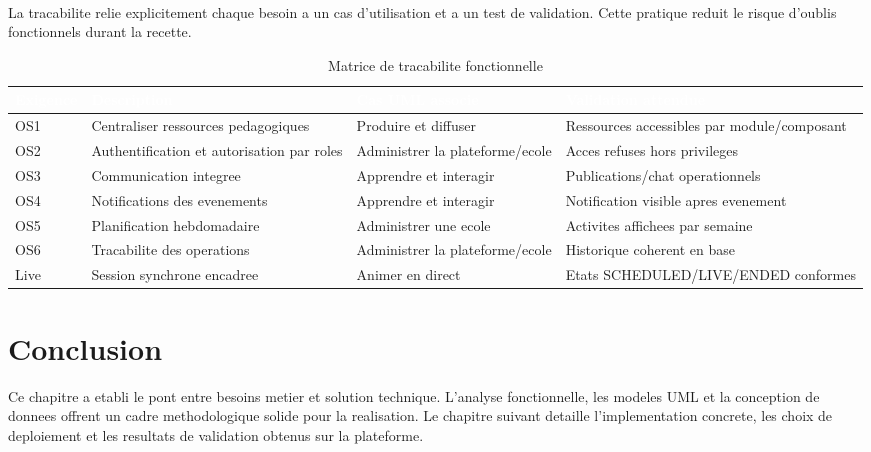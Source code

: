 ﻿﻿\documentclass[12pt,a4paper,oneside]{report}
\begin{document}
La tracabilite relie explicitement chaque besoin a un cas d'utilisation et a un test de validation. Cette pratique reduit le risque d'oublis fonctionnels durant la recette.

\renewcommand{\arraystretch}{1.35}
\begin{longtable}{|p{2.2cm}|p{4.1cm}|p{3.5cm}|p{3.6cm}|}
\caption{Matrice de tracabilite fonctionnelle}\label{tab:traceabilite}\\
\hline
\rowcolor{ustoblue}
\textcolor{white}{\textbf{Exigence}} &
\textcolor{white}{\textbf{Description}} &
\textcolor{white}{\textbf{Cas UML associe}} &
\textcolor{white}{\textbf{Validation attendue}} \\
\hline
OS1 & Centraliser ressources pedagogiques & Produire et diffuser & Ressources accessibles par module/composant \\
\hline
OS2 & Authentification et autorisation par roles & Administrer la plateforme/ecole & Acces refuses hors privileges \\
\hline
OS3 & Communication integree & Apprendre et interagir & Publications/chat operationnels \\
\hline
OS4 & Notifications des evenements & Apprendre et interagir & Notification visible apres evenement \\
\hline
OS5 & Planification hebdomadaire & Administrer une ecole & Activites affichees par semaine \\
\hline
OS6 & Tracabilite des operations & Administrer la plateforme/ecole & Historique coherent en base \\
\hline
Live & Session synchrone encadree & Animer en direct & Etats SCHEDULED/LIVE/ENDED conformes \\
\hline
\end{longtable}

\section{Conclusion}

Ce chapitre a etabli le pont entre besoins metier et solution technique. L'analyse fonctionnelle, les modeles UML et la conception de donnees offrent un cadre methodologique solide pour la realisation. Le chapitre suivant detaille l'implementation concrete, les choix de deploiement et les resultats de validation obtenus sur la plateforme.
\end{document}
